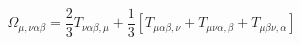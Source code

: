 \begin{equation}
\Omega_{\mu,\nu\alpha\beta} = \frac{2}{3} T_{\nu\alpha\beta,\mu} +
\frac{1}{3} [ T_{\mu\alpha\beta,\nu} + T_{\mu\nu\alpha,\beta} +
T_{\mu\beta\nu,\alpha} ]
\end{equation}


